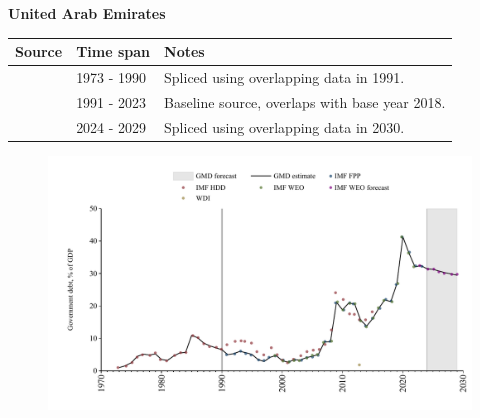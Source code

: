 \documentclass[12pt,a4paper,landscape]{article}
\begin{document}
\begin{adjustbox}{max totalsize={\paperwidth}{\paperheight},center}
\begin{minipage}[t][\textheight][t]{\textwidth}
\vspace*{0.5cm}
{}
\begin{center}
{\Large\bfseries United Arab Emirates}
\end{center}
\vspace{0.5cm}
\begin{table}[H]
\centering
\small
\begin{tabular}{|l|l|l|}
\hline
\textbf{Source} & \textbf{Time span} & \textbf{Notes} \\
\hline
\rowcolor{white}\cite{IMF_HDD}& 1973 - 1990 &Spliced using overlapping data in 1991.\\
\rowcolor{lightgray}\cite{IMF_FPP}& 1991 - 2023 &Baseline source, overlaps with base year 2018.\\
\rowcolor{white}\cite{IMF_WEO_forecast}& 2024 - 2029 &Spliced using overlapping data in 2030.\\
\hline
\end{tabular}
\end{table}
\begin{figure}[H]
\centering
\includegraphics[width=\textwidth,height=0.6\textheight,keepaspectratio]{graphs/ARE_govdebt_GDP.pdf}
\end{figure}
\end{minipage}
\end{adjustbox}
\end{document}
